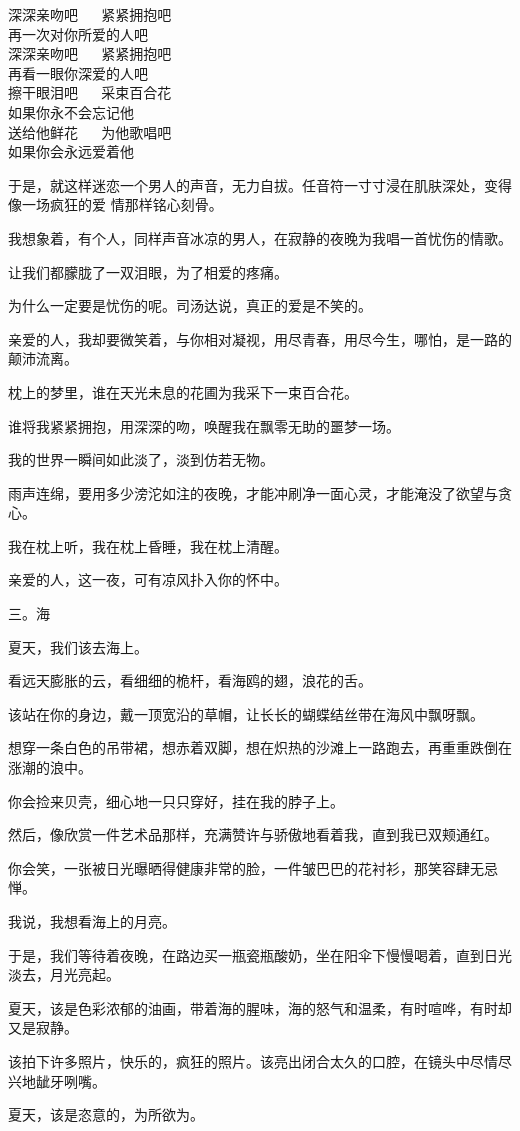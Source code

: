 \documentclass[12pt,a4paper]{article}
\def\blankrev{\vspace{1ex}}									%
\newcommand{\subpart}[1]{
	\begingroup \par
	\vspace{1ex} \centering #1
	\par \endgroup
}
\begin{document}
		\longpoem{}{}{}
		深深亲吻吧 ~~ 紧紧拥抱吧 \\
		再一次对你所爱的人吧 \\
		深深亲吻吧 ~~ 紧紧拥抱吧 \\
		再看一眼你深爱的人吧 \\
		擦干眼泪吧  ~~ 采束百合花 \\
		如果你永不会忘记他 \\
		送给他鲜花 ~~ 为他歌唱吧 \\
		如果你会永远爱着他
		\endlongpoem

		于是，就这样迷恋一个男人的声音，无力自拔。任音符一寸寸浸在肌肤深处，变得像一场疯狂的爱
	情那样铭心刻骨。

		我想象着，有个人，同样声音冰凉的男人，在寂静的夜晚为我唱一首忧伤的情歌。\par
		让我们都朦胧了一双泪眼，为了相爱的疼痛。\par
		为什么一定要是忧伤的呢。司汤达说，真正的爱是不笑的。\par
		亲爱的人，我却要微笑着，与你相对凝视，用尽青春，用尽今生，哪怕，是一路的颠沛流离。\par
		枕上的梦里，谁在天光未息的花圃为我采下一束百合花。\par
		谁将我紧紧拥抱，用深深的吻，唤醒我在飘零无助的噩梦一场。\par
		我的世界一瞬间如此淡了，淡到仿若无物。\par
		雨声连绵，要用多少滂沱如注的夜晚，才能冲刷净一面心灵，才能淹没了欲望与贪心。\par
		我在枕上听，我在枕上昏睡，我在枕上清醒。

		\blankrev
		亲爱的人，这一夜，可有凉风扑入你的怀中。


		\subpart{三。海}

		夏天，我们该去海上。

		\blankrev
		看远天膨胀的云，看细细的桅杆，看海鸥的翅，浪花的舌。\par
		该站在你的身边，戴一顶宽沿的草帽，让长长的蝴蝶结丝带在海风中飘呀飘。\par
		想穿一条白色的吊带裙，想赤着双脚，想在炽热的沙滩上一路跑去，再重重跌倒在涨潮的浪中。

		\blankrev
		你会捡来贝壳，细心地一只只穿好，挂在我的脖子上。\par
		然后，像欣赏一件艺术品那样，充满赞许与骄傲地看着我，直到我已双颊通红。\par
		你会笑，一张被日光曝晒得健康非常的脸，一件皱巴巴的花衬衫，那笑容肆无忌惮。\par
		我说，我想看海上的月亮。\par
		于是，我们等待着夜晚，在路边买一瓶瓷瓶酸奶，坐在阳伞下慢慢喝着，直到日光淡去，月光亮起。\par
		夏天，该是色彩浓郁的油画，带着海的腥味，海的怒气和温柔，有时喧哗，有时却又是寂静。\par
		该拍下许多照片，快乐的，疯狂的照片。该亮出闭合太久的口腔，在镜头中尽情尽兴地龇牙咧嘴。\par
		夏天，该是恣意的，为所欲为。
\end{document}
